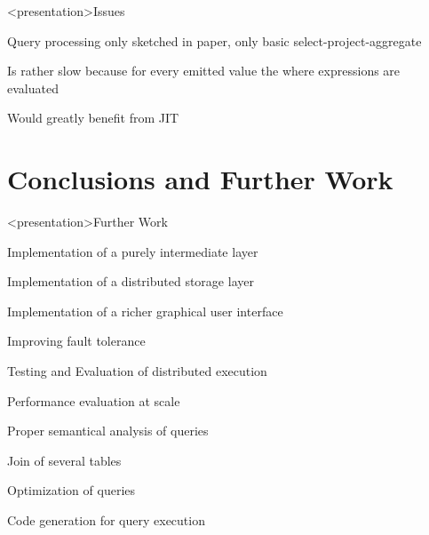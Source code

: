 \begin{frame}<presentation>{Issues}
\begin{niitemize}
 \item Query processing only sketched in paper, only basic
  select-project-aggregate
 \item Is rather slow because for every emitted value the where expressions
  are evaluated
 \item Would greatly benefit from JIT
\end{niitemize}
\end{frame}


\section{Conclusions and Further Work}
\begin{frame}<presentation>{Further Work}
\begin{niitemize}
  \item Implementation of a purely intermediate layer
  \item Implementation of a distributed storage layer
  \item Implementation of a richer graphical user interface
  \item Improving fault tolerance
  \item Testing and Evaluation of distributed execution
  \item Performance evaluation at scale
  \item Proper semantical analysis of queries
  \item Join of several tables
  \item Optimization of queries
  \item Code generation for query execution
\end{niitemize}
\end{frame}


